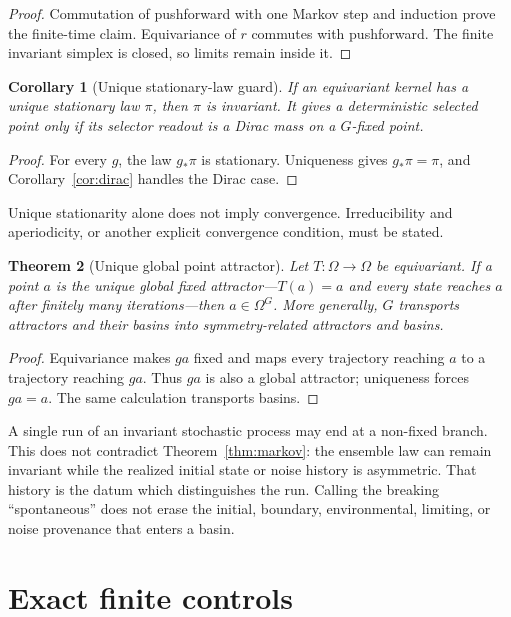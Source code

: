 \documentclass[11pt]{article}
\newtheorem{theorem}{Theorem}
\newtheorem{corollary}[theorem]{Corollary}
\theoremstyle{definition}
\begin{document}
\begin{proof}
Commutation of pushforward with one Markov step and induction prove the
finite-time claim.  Equivariance of \(r\) commutes with pushforward.  The
finite invariant simplex is closed, so limits remain inside it.
\end{proof}

\begin{corollary}[Unique stationary-law guard]\label{cor:stationary}
If an equivariant kernel has a unique stationary law \(\pi\), then \(\pi\)
is invariant.  It gives a deterministic selected point only if its selector
readout is a Dirac mass on a \(G\)-fixed point.
\end{corollary}

\begin{proof}
For every \(g\), the law \(g_*\pi\) is stationary.  Uniqueness gives
\(g_*\pi=\pi\), and Corollary~\ref{cor:dirac} handles the Dirac case.
\end{proof}

Unique stationarity alone does not imply convergence.  Irreducibility and
aperiodicity, or another explicit convergence condition, must be stated.

\begin{theorem}[Unique global point attractor]\label{thm:attractor}
Let \(T:\Omega\to\Omega\) be equivariant.  If a point \(a\) is the
unique global fixed attractor---\(T(a)=a\) and every state reaches \(a\)
after finitely many iterations---then \(a\in\Omega^G\).  More generally,
\(G\) transports attractors and their basins into symmetry-related
attractors and basins.
\end{theorem}

\begin{proof}
Equivariance makes \(ga\) fixed and maps every trajectory reaching \(a\)
to a trajectory reaching \(ga\).  Thus \(ga\) is also a global attractor;
uniqueness forces \(ga=a\).  The same calculation transports basins.
\end{proof}

A single run of an invariant stochastic process may end at a non-fixed
branch.  This does not contradict Theorem~\ref{thm:markov}: the ensemble law
can remain invariant while the realized initial state or noise history is
asymmetric.  That history is the datum which distinguishes the run.  Calling
the breaking ``spontaneous'' does not erase the initial, boundary,
environmental, limiting, or noise provenance that enters a basin.

\section{Exact finite controls}
\end{document}
